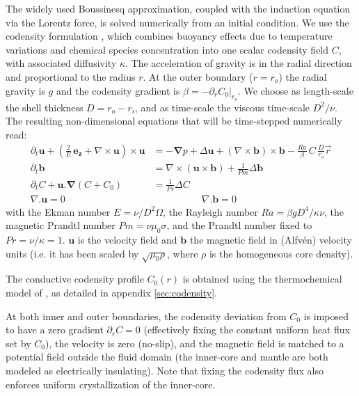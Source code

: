 \documentclass[12pt, a4paper]{article}
\renewcommand{\v}[1]{\mathbf{#1}}		%
\begin{document}
The widely used Boussinesq approximation, coupled with the induction equation via the Lorentz force, is solved numerically from an initial condition.
We use the codensity formulation \citep{braginsky1995}, which combines buoyancy effects due to temperature variations and chemical species concentration into one scalar codensity field $C$, with associated diffusivity $\kappa$.
The acceleration of gravity is in the radial direction and proportional to the radius $r$.
At the outer boundary ($r=r_o$) the radial gravity is $g$ and the codensity gradient is $\beta = -\partial_r C_0|_{r_o}$.
We choose as length-scale the shell thickness $D=r_o-r_i$, and as time-scale the viscous time-scale $D^2/\nu$.
The resulting non-dimensional equations that will be time-stepped numerically read:
\begin{align}
  \partial_t \v{u} + \left(\frac{2}{E}\,\v{e_z} + \nabla \times \v{u}\right) \times \v{u} &= -\v{\nabla} p + \Delta \v{u} + (\nabla \times \v{b}) \times \v{b} - \frac{Ra}{\beta}\,C\,\frac{D}{r_o}\vec{r}   \label{eq:NS} \\
  \partial_t \v{b} &= \nabla \times (\v{u} \times \v{b}) + \frac{1}{Pm} \Delta \v{b} \\
  \partial_t C + \v{u}.\v{\nabla} (C + C_0) &= \frac{1}{Pr} \Delta C \label{eq:codensity} \\
  \nabla . \v{u} = 0 & \quad \quad \quad \quad \quad \nabla . \v{b} = 0
\end{align}
with the Ekman number $E = \nu / D^2 \Omega$, the Rayleigh number $Ra = \beta g D^4/\kappa\nu$, the magnetic Prandtl number $Pm = \nu \mu_0 \sigma$, and the Prandtl number fixed to $Pr = \nu / \kappa = 1$.
$\v{u}$ is the velocity field and $\v{b}$ the magnetic field in (Alfv\'en) velocity units (i.e. it has been scaled by $\sqrt{\mu_0\rho}$, where $\rho$ is the homogeneous core density).

The conductive codensity profile $C_0(r)$ is obtained using the thermochemical model of \citet{aubert2009}, as detailed in appendix \ref{sec:codensity}.

At both inner and outer boundaries, the codensity deviation from $C_0$ is imposed to have a zero gradient $\partial_r C = 0$  (effectively fixing the constant uniform heat flux set by $C_0$), the velocity is zero (no-slip), and the magnetic field is matched to a potential field outside the fluid domain (the inner-core and mantle are both modeled as electrically insulating).
Note that fixing the codensity flux also enforces uniform crystallization of the inner-core.
\end{document}
